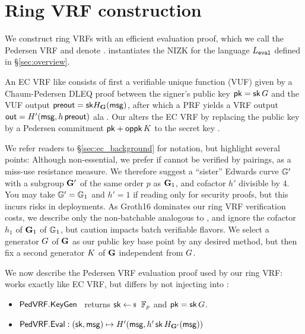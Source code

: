 \section{Ring VRF construction}%
\label{sec:pederson_vrf}

We construct ring VRFs with an efficient evaluation proof, which
we call the Pedersen VRF and denote \PedVRF.
\PedVRF instantiates the NIZK for the language $L_{\mathtt{eval}}$ defined in \S\ref{sec:overview}.

An EC VRF like \cite{nsec5,VXEd25519,draft-irtf-cfrg-vrf-10} 
consists of first a verifiable unique function (VUF) given by a
Chaum-Pedersen DLEQ proof between the signer's public key $\mathsf{pk} = \mathsf{sk} \, G$ and
 the VUF output ${\mathsf{preout}} = \mathsf{sk} H_{{\mathbf{G}}}(\mathsf{msg})$,
after which a PRF  yields a VRF output
 ${\mathsf{out}} = H'(\mathsf{msg}, h \, {\mathsf{preout}})$ ala \cite[Proposition 1]{vrf_micali}.
%
Our \PedVRF alters the EC VRF by replacing the public key by
a Pedersen commitment $\mathsf{pk} + \mathsf{oppk} \, K$ to the secret key \sk.%


We refer readers to \S\ref{sec:ec_background} for notation,
 but highlight several points: 
%
Although non-essential, we prefer if \PreOut cannot be verified
by pairings, as a miss-use resistance measure.
We therefore suggest a ``sister'' Edwards curve ${\mathbb{G}}'$ with
 a subgroup ${\mathbf{G}}'$ of the same order $p$ as ${\mathbf{G}}_1$,
 and cofactor $h'$ divisible by 4.
You may take ${\mathbb{G}}' = {\mathbb{G}}_1$ and $h' = 1$ if reading only for
security proofs, but this incurs risks in deployments.
%
As Groth16 dominates our ring VRF verification costs, we describe only
the non-batchable \PedVRF analogous to \cite{nsec5,VXEd25519,draft-irtf-cfrg-vrf-10},
and ignore the cofactor $h_1$ of ${\mathbf{G}}_1$ of ${\mathbb{G}}_1$, 
but caution \cite{HdVBatchEd25519} impacts batch verifiable flavors.
%
We select a generator $G$ of ${\mathbf{G}}$ as our public key base point
 by any desired method, but then
fix a second generator $K$ of ${\mathbf{G}}$ independent from $G$.

We now describe the Pedersen VRF \PedVRF evaluation proof used by our ring VRF:
%
\KeyGen works exactly like EC VRF, but
 \Eval differs by not injecting \pk into \msg:
\begin{itemize}
\item ${\mathsf{PedVRF}}.{\mathsf{KeyGen}}$ \, returns $\sk \leftsample \F_p$ and $\mathsf{pk} = \mathsf{sk} \, G$.
\item ${\mathsf{PedVRF}}.{\mathsf{Eval}} : (\mathsf{sk},\mathsf{msg}) \mapsto H'(\mathsf{msg}, h' \, \mathsf{sk} \, H_{{\mathbf{G}}'}(\mathsf{msg}))$
\end{itemize}

